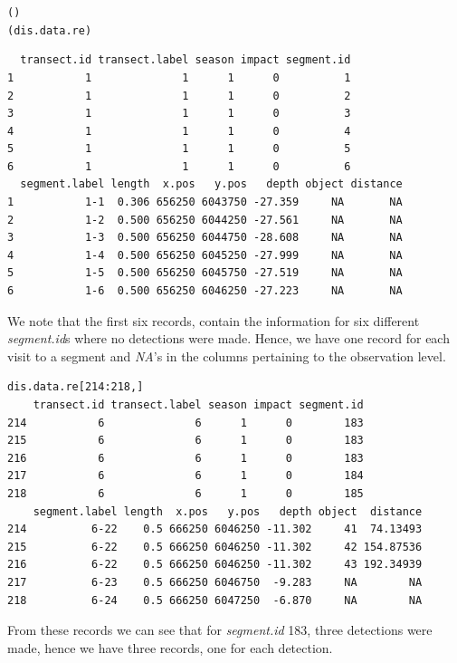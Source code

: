 \begin{knitrout}\scriptsize
{}\color{fgcolor}\begin{kframe}
\begin{alltt}
()
(dis.data.re)
\end{alltt}
\begin{verbatim}
  transect.id transect.label season impact segment.id
1           1              1      1      0          1
2           1              1      1      0          2
3           1              1      1      0          3
4           1              1      1      0          4
5           1              1      1      0          5
6           1              1      1      0          6
  segment.label length  x.pos   y.pos   depth object distance
1           1-1  0.306 656250 6043750 -27.359     NA       NA
2           1-2  0.500 656250 6044250 -27.561     NA       NA
3           1-3  0.500 656250 6044750 -28.608     NA       NA
4           1-4  0.500 656250 6045250 -27.999     NA       NA
5           1-5  0.500 656250 6045750 -27.519     NA       NA
6           1-6  0.500 656250 6046250 -27.223     NA       NA
\end{verbatim}
\end{kframe}
\end{knitrout}
\noindent We note that the first six records, contain the information for six different \textit{segment.id}s where no detections were made. Hence, we have one record for each visit to a segment and \textit{NA}'s in the columns pertaining to the observation level. 

\begin{knitrout}\footnotesize
{}\color{fgcolor}\begin{kframe}
\begin{verbatim}
dis.data.re[214:218,]
    transect.id transect.label season impact segment.id
214           6              6      1      0        183
215           6              6      1      0        183
216           6              6      1      0        183
217           6              6      1      0        184
218           6              6      1      0        185
    segment.label length  x.pos   y.pos   depth object  distance
214          6-22    0.5 666250 6046250 -11.302     41  74.13493
215          6-22    0.5 666250 6046250 -11.302     42 154.87536
216          6-22    0.5 666250 6046250 -11.302     43 192.34939
217          6-23    0.5 666250 6046750  -9.283     NA        NA
218          6-24    0.5 666250 6047250  -6.870     NA        NA
\end{verbatim}
\end{kframe}
\end{knitrout}
\noindent From these records we can see that for \textit{segment.id} 183, three detections were made, hence we have three records, one for each detection. \\


